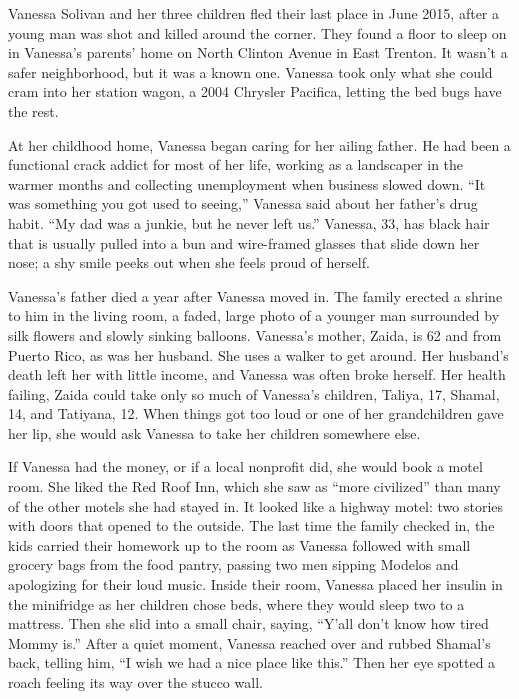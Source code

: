 Vanessa Solivan and her three children fled their last place in June
2015, after a young man was shot and killed around the corner. They
found a floor to sleep on in Vanessa's parents' home on North Clinton
Avenue in East Trenton. It wasn't a safer neighborhood, but it was a
known one. Vanessa took only what she could cram into her station wagon,
a 2004 Chrysler Pacifica, letting the bed bugs have the rest.

At her childhood home, Vanessa began caring for her ailing father. He
had been a functional crack addict for most of her life, working as a
landscaper in the warmer months and collecting unemployment when
business slowed down. ``It was something you got used to seeing,''
Vanessa said about her father's drug habit. ``My dad was a junkie, but
he never left us.'' Vanessa, 33, has black hair that is usually pulled
into a bun and wire-framed glasses that slide down her nose; a shy smile
peeks out when she feels proud of herself.

Vanessa's father died a year after Vanessa moved in. The family erected
a shrine to him in the living room, a faded, large photo of a younger
man surrounded by silk flowers and slowly sinking balloons. Vanessa's
mother, Zaida, is 62 and from Puerto Rico, as was her husband. She uses
a walker to get around. Her husband's death left her with little income,
and Vanessa was often broke herself. Her health failing, Zaida could
take only so much of Vanessa's children, Taliya, 17, Shamal, 14, and
Tatiyana, 12. When things got too loud or one of her grandchildren gave
her lip, she would ask Vanessa to take her children somewhere else.

If Vanessa had the money, or if a local nonprofit did, she would book a
motel room. She liked the Red Roof Inn, which she saw as ``more
civilized'' than many of the other motels she had stayed in. It looked
like a highway motel: two stories with doors that opened to the outside.
The last time the family checked in, the kids carried their homework up
to the room as Vanessa followed with small grocery bags from the food
pantry, passing two men sipping Modelos and apologizing for their loud
music. Inside their room, Vanessa placed her insulin in the minifridge
as her children chose beds, where they would sleep two to a mattress.
Then she slid into a small chair, saying, ``Y'all don't know how tired
Mommy is.'' After a quiet moment, Vanessa reached over and rubbed
Shamal's back, telling him, ``I wish we had a nice place like this.''
Then her eye spotted a roach feeling its way over the stucco wall.

